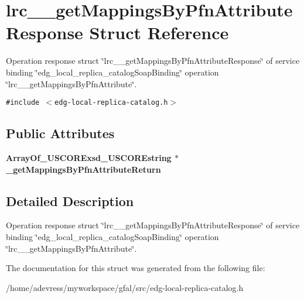 \section{lrc\_\-\_\-get\-Mappings\-By\-Pfn\-Attribute\-Response Struct Reference}
\label{structlrc____getMappingsByPfnAttributeResponse}
Operation response struct \char`\"{}lrc\_\-\_\-get\-Mappings\-By\-Pfn\-Attribute\-Response\char`\"{} of service binding \char`\"{}edg\_\-local\_\-replica\_\-catalog\-Soap\-Binding\char`\"{} operation \char`\"{}lrc\_\-\_\-get\-Mappings\-By\-Pfn\-Attribute\char`\"{}.  


{\tt \#include $<$edg-local-replica-catalog.h$>$}

\subsection*{Public Attributes}
\begin{CompactItemize}
\item 
\bf{Array\-Of\_\-USCORExsd\_\-USCOREstring} $\ast$ \textbf{\_\-get\-Mappings\-By\-Pfn\-Attribute\-Return}\label{structlrc____getMappingsByPfnAttributeResponse_65c7fecb378f7a2707c8d5e2ea7d829b}

\end{CompactItemize}


\subsection{Detailed Description}
Operation response struct \char`\"{}lrc\_\-\_\-get\-Mappings\-By\-Pfn\-Attribute\-Response\char`\"{} of service binding \char`\"{}edg\_\-local\_\-replica\_\-catalog\-Soap\-Binding\char`\"{} operation \char`\"{}lrc\_\-\_\-get\-Mappings\-By\-Pfn\-Attribute\char`\"{}. 



The documentation for this struct was generated from the following file:\begin{CompactItemize}
\item 
/home/adevress/myworkspace/gfal/src/edg-local-replica-catalog.h\end{CompactItemize}
